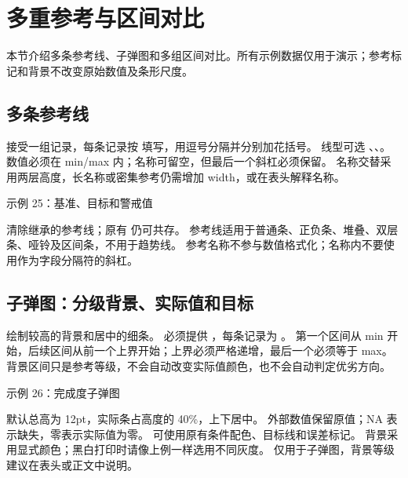 \section{多重参考与区间对比}
本节介绍多条参考线、子弹图和多组区间对比。所有示例数据仅用于演示；参考标记和背景不改变原始数值及条形尺度。

\subsection{多条参考线}
 接受一组记录，每条记录按
 填写，用逗号分隔并分别加花括号。
线型可选 、、。
数值必须在 min/max 内；名称可留空，但最后一个斜杠必须保留。
名称交替采用两层高度，长名称或密集参考仍需增加 width，或在表头解释名称。

\begin{example}[sidebyside=false]{示例 25：基准、目标和警戒值}
\end{example}
 清除继承的参考线；原有  仍可共存。
参考线适用于普通条、正负条、堆叠、双层条、哑铃及区间条，不用于趋势线。
参考名称不参与数值格式化；名称内不要使用作为字段分隔符的斜杠。

\subsection{子弹图：分级背景、实际值和目标}
 绘制较高的背景和居中的细条。
必须提供 ，每条记录为 。
第一个区间从 min 开始，后续区间从前一个上界开始；上界必须严格递增，最后一个必须等于 max。
背景区间只是参考等级，不会自动改变实际值颜色，也不会自动判定优劣方向。

\begin{example}[sidebyside=false]{示例 26：完成度子弹图}
\end{example}
默认总高为 12pt，实际条占高度的 40\%，上下居中。
外部数值保留原值；NA 表示缺失，零表示实际值为零。
可使用原有条件配色、目标线和误差标记。
背景采用显式颜色；黑白打印时请像上例一样选用不同灰度。
 仅用于子弹图，背景等级建议在表头或正文中说明。

